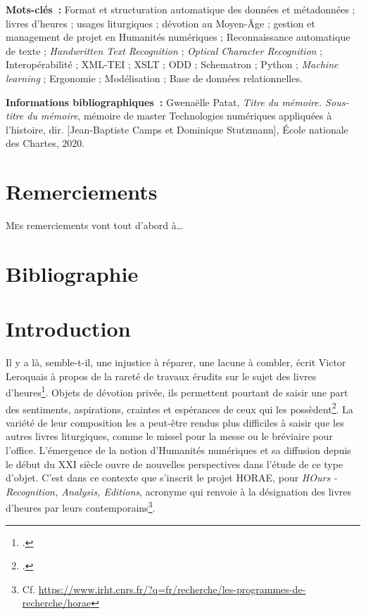 \documentclass[a4paper,12pt,twoside]{book}
\begin{document}
	\textbf{Mots-clés~:} Format et structuration automatique des données et métadonnées ; livres d'heures ; usages liturgiques ; dévotion au Moyen-Âge ; gestion et management de projet en Humanités numériques ; Reconnaissance automatique de texte ; \textit{Handwritten Text Recognition} ; \textit{Optical Character Recognition} ; Interopérabilité ; XML-TEI ; XSLT ; ODD ; Schematron ; Python ; \textit{Machine learning} ; Ergonomie ; Modélisation ; Base de données relationnelles.
	
	\textbf{Informations bibliographiques~:} Gwenaëlle Patat, \textit{Titre du mémoire. Sous-titre du mémoire}, mémoire de master \og{}Technologies numériques appliquées à l'histoire\fg{}, dir. [Jean-Baptiste Camps et Dominique Stutzmann], École nationale des Chartes, 2020.
	
	\chapter*{Remerciements}
	
	\lettrine{M}es remerciements vont tout d'abord à\dots

    \newpage
	\chapter*{Bibliographie}
	    \printbibliography[heading=subbibliography,keyword={MA},title={Manuscrits, livres d'heures, liturgie et dévotion au Moyen Âge}]	
	    \newpage
	     \printbibliography[heading=subbibliography,keyword={HN},title={Réflexions autour des Humanités numériques}]
	     \newpage
	     \printbibliography[heading=subbibliography,keyword={technologies},title={Normes, méthodes et pratiques numériques}]	
	
	
	\chapter*{Introduction}

	\og Il y a là, semble-t-il, une injustice à réparer, une lacune à combler\fg{}, écrit Victor Leroquais à propos de la rareté de travaux érudits sur le sujet des livres d'heures\footcite[p. II]{Leroquais_notices}. Objets de dévotion privée, ils permettent pourtant de saisir une part des sentiments, aspirations, craintes et espérances de ceux qui les possèdent\footcite[p. II]{Leroquais_notices}. La variété de leur composition les a peut-être rendus plus difficiles à saisir que les autres livres liturgiques, comme le missel pour la messe ou le bréviaire pour l'office. L'émergence de la notion d'\og Humanités numériques \fg{} et sa diffusion depuis le début du \textsc{XXI} siècle ouvre de nouvelles perspectives dans l'étude de ce type d'objet. C'est dans ce contexte que s'inscrit le projet HORAE, pour \textit{HOurs - Recognition, Analysis, Editions}, acronyme qui renvoie à la désignation des livres d'heures par leurs contemporains\footnote{Cf. \url{https://www.irht.cnrs.fr/?q=fr/recherche/les-programmes-de-recherche/horae}}. \\
	
\end{document}
